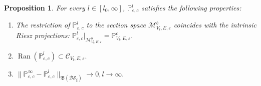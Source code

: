 \documentclass[reqno,11pt]{amsart}
\newtheorem{proposition}{Proposition}[section]
\begin{document}
\begin{proposition}\label{thm:ambient-projection}
For every $l\in[l_0,\infty]$,  $\mathbb{ P }_{\varepsilon, c}^{l}$ satisfies the following properties:
\begin{enumerate}
\item The restriction of $\mathbb{ P }_{\varepsilon, c}^{l}$ to the section space $\mathcal M_{V_l,E,\varepsilon}^b$ coincides with the intrinsic Riesz projections:    $
    \mathbb P_{\varepsilon,c}^{l}\big|_{\mathcal M_{V_l,E,\varepsilon}^b} = \mathbb P_{V_l,E,\varepsilon}^c.
    $
    \item  
    $
    \operatorname{Ran}(\mathbb{ P }_{\varepsilon,c}^{l}) \subset \mathcal{C}_{V_l,E,\varepsilon}.
    $
    \item  $
\|\mathbb{ P }_{\varepsilon,c}^{\infty}-\mathbb{ P }_{\varepsilon,c}^{l}\|_{\mathfrak{B}( \mathcal{BS}_\xi)}\to 0,
 l\to\infty.
$
\end{enumerate}
\end{proposition}
\end{document}
